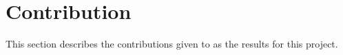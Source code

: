 \section{Contribution}
\label{contribution}
This section describes the contributions given to \qs{} as the results for this project.